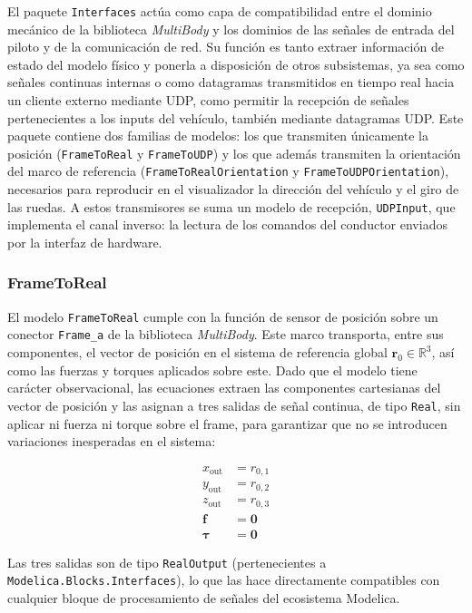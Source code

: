 El paquete \verb|Interfaces| actúa como capa de compatibilidad entre el dominio mecánico de la biblioteca \textit{MultiBody} y los dominios de las señales de entrada del piloto y de la comunicación de red. Su función es tanto extraer información de estado del modelo físico y ponerla a disposición de otros subsistemas, ya sea como señales continuas internas o como datagramas transmitidos en tiempo real hacia un cliente externo mediante UDP, como permitir la recepción de señales pertenecientes a los inputs del vehículo, también mediante datagramas UDP. Este paquete contiene dos familias de modelos: los que transmiten únicamente la posición (\verb|FrameToReal| y \verb|FrameToUDP|) y los que además transmiten la orientación del marco de referencia (\verb|FrameToRealOrientation| y \verb|FrameToUDPOrientation|), necesarios para reproducir en el visualizador la dirección del vehículo y el giro de las ruedas. A estos transmisores se suma un modelo de recepción, \verb|UDPInput|, que implementa el canal inverso: la lectura de los comandos del conductor enviados por la interfaz de hardware.\\

\subsubsection{FrameToReal}

El modelo \verb|FrameToReal| cumple con la función de sensor de posición sobre un conector \verb|Frame_a| de la biblioteca \textit{MultiBody}. Este marco transporta, entre sus componentes, el vector de posición en el sistema de referencia global $\mathbf{r}_0 \in \mathbb{R}^3$, así como las fuerzas y torques aplicados sobre este. Dado que el modelo tiene carácter observacional, las ecuaciones extraen las componentes cartesianas del vector de posición y las asignan a tres salidas de señal continua, de tipo \verb|Real|, sin aplicar ni fuerza ni torque sobre el frame, para garantizar que no se introducen variaciones inesperadas en el sistema:

\begin{align}
    x_{\text{out}} &= r_{0,1} \\
    y_{\text{out}} &= r_{0,2} \\
    z_{\text{out}} &= r_{0,3} \\
    \mathbf{f} &= \mathbf{0} \\
    \boldsymbol{\tau} &= \mathbf{0}
\end{align}

Las tres salidas son de tipo \verb|RealOutput| (pertenecientes a \verb|Modelica.Blocks.Interfaces|), lo que las hace directamente compatibles con cualquier bloque de procesamiento de señales del ecosistema Modelica.\\


